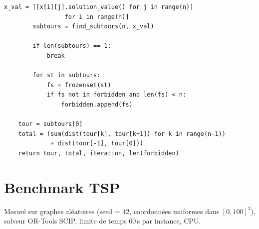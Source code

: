 \documentclass[12pt, a4paper]{article}
\begin{document}
\begin{lstlisting}[caption={Concorde-inspired : LP + DFJ lazy + branch-and-cut (OR-Tools SCIP)}]
        x_val = [[x[i][j].solution_value() for j in range(n)]
                 for i in range(n)]
        subtours = find_subtours(n, x_val)

        if len(subtours) == 1:
            break

        for st in subtours:
            fs = frozenset(st)
            if fs not in forbidden and len(fs) < n:
                forbidden.append(fs)

    tour = subtours[0]
    total = (sum(dist(tour[k], tour[k+1]) for k in range(n-1))
             + dist(tour[-1], tour[0]))
    return tour, total, iteration, len(forbidden)
\end{lstlisting}

\section{Benchmark TSP}

Mesuré sur graphes aléatoires (seed = 42, coordonnées uniformes dans $[0,100]^2$),
solveur OR-Tools SCIP, limite de temps 60\,s par instance, CPU.

\begin{table}[h]
  \centering
  \caption{Résultats benchmark Concorde-inspired (OR-Tools SCIP + DFJ lazy).}
\end{table}
\end{document}
